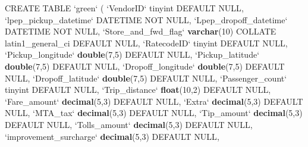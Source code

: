 \documentclass[12pt,twoside]{reedthesis}
\newenvironment{Shaded}{\begin{snugshade}}{\end{snugshade}}
\newcommand{\KeywordTok}[1]{\textcolor[rgb]{0.13,0.29,0.53}{\textbf{#1}}}
\newcommand{\DataTypeTok}[1]{\textcolor[rgb]{0.13,0.29,0.53}{#1}}
\newcommand{\DecValTok}[1]{\textcolor[rgb]{0.00,0.00,0.81}{#1}}
\newcommand{\StringTok}[1]{\textcolor[rgb]{0.31,0.60,0.02}{#1}}
\newcommand{\OtherTok}[1]{\textcolor[rgb]{0.56,0.35,0.01}{#1}}
\newcommand{\NormalTok}[1]{#1}
\theoremstyle{definition}
\theoremstyle{definition}
\theoremstyle{definition}
\theoremstyle{remark}
\begin{document}
\begin{Shaded}
\begin{Highlighting}[]
\NormalTok{CREATE TABLE }\StringTok{`}\DataTypeTok{green}\StringTok{`}\NormalTok{ (}
 \StringTok{`}\DataTypeTok{VendorID}\StringTok{`}\NormalTok{ tinyint DEFAULT }\OtherTok{NULL}\NormalTok{,}
 \StringTok{`}\DataTypeTok{lpep_pickup_datetime}\StringTok{`}\NormalTok{ DATETIME NOT }\OtherTok{NULL}\NormalTok{,}
 \StringTok{`}\DataTypeTok{Lpep_dropoff_datetime}\StringTok{`}\NormalTok{ DATETIME NOT }\OtherTok{NULL}\NormalTok{,}
 \StringTok{`}\DataTypeTok{Store_and_fwd_flag}\StringTok{`} \KeywordTok{varchar}\NormalTok{(}\DecValTok{10}\NormalTok{) COLLATE latin1_general_ci DEFAULT }\OtherTok{NULL}\NormalTok{,}
 \StringTok{`}\DataTypeTok{RatecodeID}\StringTok{`}\NormalTok{ tinyint DEFAULT }\OtherTok{NULL}\NormalTok{,}
 \StringTok{`}\DataTypeTok{Pickup_longitude}\StringTok{`} \KeywordTok{double}\NormalTok{(}\DecValTok{7}\NormalTok{,}\DecValTok{5}\NormalTok{) DEFAULT }\OtherTok{NULL}\NormalTok{,}
 \StringTok{`}\DataTypeTok{Pickup_latitude}\StringTok{`} \KeywordTok{double}\NormalTok{(}\DecValTok{7}\NormalTok{,}\DecValTok{5}\NormalTok{) DEFAULT }\OtherTok{NULL}\NormalTok{,}
 \StringTok{`}\DataTypeTok{Dropoff_longitude}\StringTok{`} \KeywordTok{double}\NormalTok{(}\DecValTok{7}\NormalTok{,}\DecValTok{5}\NormalTok{) DEFAULT }\OtherTok{NULL}\NormalTok{,}
 \StringTok{`}\DataTypeTok{Dropoff_latitude}\StringTok{`} \KeywordTok{double}\NormalTok{(}\DecValTok{7}\NormalTok{,}\DecValTok{5}\NormalTok{) DEFAULT }\OtherTok{NULL}\NormalTok{,}
 \StringTok{`}\DataTypeTok{Passenger_count}\StringTok{`}\NormalTok{ tinyint DEFAULT }\OtherTok{NULL}\NormalTok{,}
 \StringTok{`}\DataTypeTok{Trip_distance}\StringTok{`} \KeywordTok{float}\NormalTok{(}\DecValTok{10}\NormalTok{,}\DecValTok{2}\NormalTok{) DEFAULT }\OtherTok{NULL}\NormalTok{,}
 \StringTok{`}\DataTypeTok{Fare_amount}\StringTok{`} \KeywordTok{decimal}\NormalTok{(}\DecValTok{5}\NormalTok{,}\DecValTok{3}\NormalTok{) DEFAULT }\OtherTok{NULL}\NormalTok{,}
 \StringTok{`}\DataTypeTok{Extra}\StringTok{`} \KeywordTok{decimal}\NormalTok{(}\DecValTok{5}\NormalTok{,}\DecValTok{3}\NormalTok{) DEFAULT }\OtherTok{NULL}\NormalTok{,}
 \StringTok{`}\DataTypeTok{MTA_tax}\StringTok{`} \KeywordTok{decimal}\NormalTok{(}\DecValTok{5}\NormalTok{,}\DecValTok{3}\NormalTok{) DEFAULT }\OtherTok{NULL}\NormalTok{,}
 \StringTok{`}\DataTypeTok{Tip_amount}\StringTok{`} \KeywordTok{decimal}\NormalTok{(}\DecValTok{5}\NormalTok{,}\DecValTok{3}\NormalTok{) DEFAULT }\OtherTok{NULL}\NormalTok{,}
 \StringTok{`}\DataTypeTok{Tolls_amount}\StringTok{`} \KeywordTok{decimal}\NormalTok{(}\DecValTok{5}\NormalTok{,}\DecValTok{3}\NormalTok{) DEFAULT }\OtherTok{NULL}\NormalTok{,}
 \StringTok{`}\DataTypeTok{improvement_surcharge}\StringTok{`} \KeywordTok{decimal}\NormalTok{(}\DecValTok{5}\NormalTok{,}\DecValTok{3}\NormalTok{) DEFAULT }\OtherTok{NULL}\NormalTok{,}

\end{Highlighting}
\end{Shaded}
\end{document}
